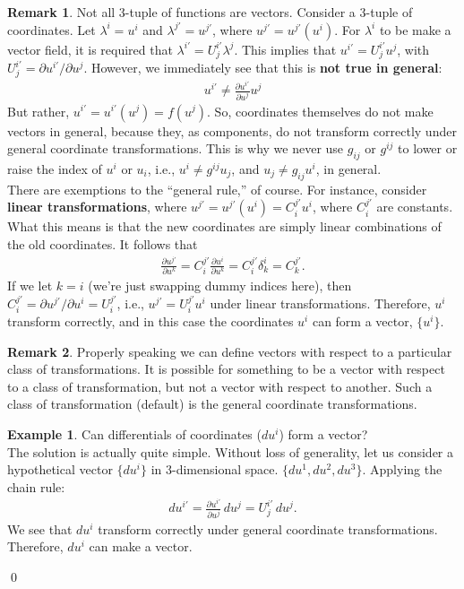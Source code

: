 \documentclass{book}
\theoremstyle{definition}
\newtheorem{rmk}{Remark}[section]
\newtheorem{exmp}{Example}[section]
\begin{document}
\begin{rmk}
	Not all 3-tuple of functions are vectors. Consider a 3-tuple of coordinates. Let $\lambda^i = u^i$ and $\lambda^{j'} = u^{j'}$, where $u^{j'} = u^{j'}(u^i)$. For $\lambda^i$ to be make a vector field, it is required that $\lambda^{i'} = U^{i'}_j\lambda^j$. This implies that $u^{i'} = U^{i'}_ju^j$, with $U^{i'}_j = \partial u^{i'}/\partial u^j$. However, we immediately see that this is \textbf{not true in general}:
	\begin{align*}
	\boxed{u^{i'} \neq \frac{\partial u^{i'}}{\partial u^j}u^j}
	\end{align*}
	But rather, $u^{i'} = u^{i'}(u^j) = f(u^j)$. So, coordinates themselves do not make vectors in general, because they, as components, do not transform correctly under general coordinate transformations. This is why we never use $g_{ij}$ or $g^{ij}$ to lower or raise the index of $u^i$ or $u_i$, i.e., $u^i \neq g^{ij}u_j$, and $u_j \neq g_{ij}u^i$, in general. \\
	
	There are exemptions to the ``general rule,'' of course. For instance, consider \textbf{linear transformations}, where $u^{j'} = u^{j'}(u^i) = C^{j'}_iu^i$, where $C^{j'}_i$ are constants. What this means is that the new coordinates are simply linear combinations of the old coordinates. It follows that
	\begin{align*}
	\frac{\partial u^{j'}}{\partial u^k} = C^{j'}_i\frac{\partial u^i}{\partial u^k} = C^{j'}_i\delta^i_k=C^{j'}_k.
	\end{align*}
	If we let $k=i$ (we're just swapping dummy indices here), then $C^{j'}_i = \partial u^{j'}/\partial u^i = U^{j'}_i$, i.e., $u^{j'} = U^{j'}_iu^i$ under linear transformations. Therefore, $u^i$ transform correctly, and in this case the coordinates $u^i$ can form a vector, $\{u^i\}$.
\end{rmk}
\begin{rmk}
	Properly speaking we can define vectors with respect to a particular class of transformations. It is possible for something to be a vector with respect to a class of transformation, but not a vector with respect to another. Such a class of transformation (default) is the general coordinate transformations. 
\end{rmk}
\begin{exmp}
	Can differentials of coordinates ($du^i$) form a vector?\\
	
	The solution is actually quite simple. Without loss of generality, let us consider a hypothetical vector $\{ du^i \}$ in 3-dimensional space. $\{du^1, du^2, du^3 \}$. Applying the chain rule:
	\begin{align*}
	du^{i'} = \frac{\partial u^{i'}}{\partial u^{j}}\,du^j = U^{i'}_j\,du^j.
	\end{align*}
	We see that $du^i$ transform correctly under general coordinate transformations. Therefore, $du^i$ can make a vector. 
\end{exmp}\qed
\end{document}
